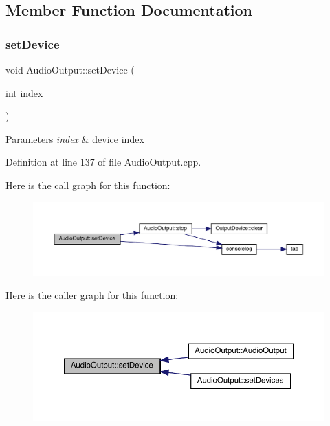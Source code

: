\subsection{Member Function Documentation}
\mbox{\label{class_audio_output_a1bfc3c2ca0fa53a8e2962ef784014317}} 
\subsubsection{\texorpdfstring{set\+Device}{setDevice}}
{\footnotesize\ttfamily void Audio\+Output\+::set\+Device (\begin{DoxyParamCaption}\item[{int}]{index }\end{DoxyParamCaption})\hspace{0.3cm}{\ttfamily [slot]}}


\begin{DoxyParams}{Parameters}
{\em index} & device index \\
\hline
\end{DoxyParams}


Definition at line 137 of file Audio\+Output.\+cpp.

Here is the call graph for this function\+:
\nopagebreak
\begin{figure}[H]
\begin{center}
\leavevmode
\includegraphics[width=350pt]{class_audio_output_a1bfc3c2ca0fa53a8e2962ef784014317_cgraph}
\end{center}
\end{figure}
Here is the caller graph for this function\+:
\nopagebreak
\begin{figure}[H]
\begin{center}
\leavevmode
\includegraphics[width=350pt]{class_audio_output_a1bfc3c2ca0fa53a8e2962ef784014317_icgraph}
\end{center}
\end{figure}
\mbox{\label{class_audio_output_a27ada29ff74a99f5c21d949caba261ee}} 
